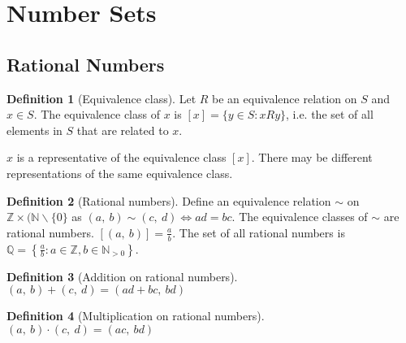 \documentclass{article}
\newcommand*{\N}{\mathbb{N}}
\newcommand*{\Z}{\mathbb{Z}}
\newcommand*{\Q}{\mathbb{Q}}
\theoremstyle{plain}
\numberwithin{theorem}{subsection}
\theoremstyle{definition}
\newtheorem{definition}{Definition}[section]
\numberwithin{definition}{subsection}
\theoremstyle{remark}
\numberwithin{note}{section}
\begin{document}
\section{Number Sets}
\subsection{Rational Numbers}
\begin{definition}[Equivalence class]
    Let $R$ be an equivalence relation on $S$ and $x \in S$.
    The equivalence class of $x$ is $[x] = \{y \in S : xRy\}$,
    i.e. the set of all elements in $S$ that are related to $x$.

    $x$ is a representative of the equivalence class $[x]$.
    There may be different representations of the same equivalence class.
\end{definition}
%
\begin{definition}[Rational numbers]
    Define an equivalence relation $\sim$ on $\Z \times (\N\backslash\{0\}$
    as $(a,\: b) \sim (c,\: d) \iff ad=bc$.
    The equivalence classes of $\sim$ are rational numbers.
    $[(a,\: b)] = \frac{a}{b}$.
    The set of all rational numbers is
    $\Q = \left\{ \frac{a}{b} : a\in \Z, b\in \N_{>0} \right\}$.
\end{definition}
%
\begin{definition}[Addition on rational numbers]
    $(a,\: b) + (c,\: d) = (ad+bc,\: bd)$
\end{definition}
%
\begin{definition}[Multiplication on rational numbers]
    $(a,\: b) \cdot (c,\: d) = (ac,\: bd)$
\end{definition}
%
\end{document}
